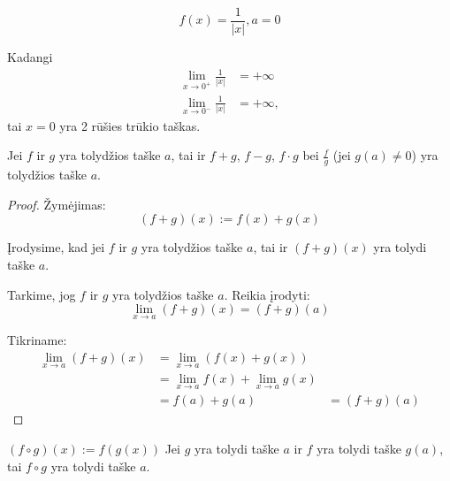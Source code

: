 \begin{exmp}
  \begin{equation*}
    f(x) = \frac{1}{|x|}, a = 0
  \end{equation*}

  Kadangi
  \begin{align*}
    \lim_{x \to 0^{+}} \frac{1}{|x|} &= +\infty \\
    \lim_{x \to 0^{-}} \frac{1}{|x|} &= +\infty,
  \end{align*}
  tai $x = 0$ yra 2 rūšies trūkio taškas.
\end{exmp}

\begin{prop}
  Jei $f$ ir $g$ yra tolydžios taške $a$, tai ir 
  $f + g$, $f - g$, $f \cdot g$ bei $\frac{f}{g}$ (jei $g(a) \neq 0$) 
  yra tolydžios taške $a$.

  \begin{proof}
    Žymėjimas:
    \begin{equation*}
      (f + g)(x) := f(x) + g(x)
    \end{equation*}

    Įrodysime, kad jei $f$ ir $g$ yra tolydžios taške $a$, tai ir 
    $(f + g)(x)$ yra tolydi taške $a$.

    Tarkime, jog $f$ ir $g$ yra tolydžios taške $a$. Reikia įrodyti:
    \begin{equation*}
      \lim_{x \to a} (f + g)(x) = (f + g)(a)
    \end{equation*}

    Tikriname:
    \begin{align*}
      \lim_{x \to a} (f + g)(x)
      &= \lim_{x \to a} (f(x) + g(x)) \\
      &= \lim_{x \to a} f(x) + \lim_{x \to a} g(x) \\
      &= f(a) + g(a)
      &= (f + g)(a)
    \end{align*}
  \end{proof}
\end{prop}

\begin{prop}
  $ (f \circ g)(x) := f(g(x))$ Jei $g$ yra tolydi taške $a$ ir 
  $f$ yra tolydi taške $g(a)$, tai $f \circ g$ yra tolydi taške $a$.
\end{prop}
